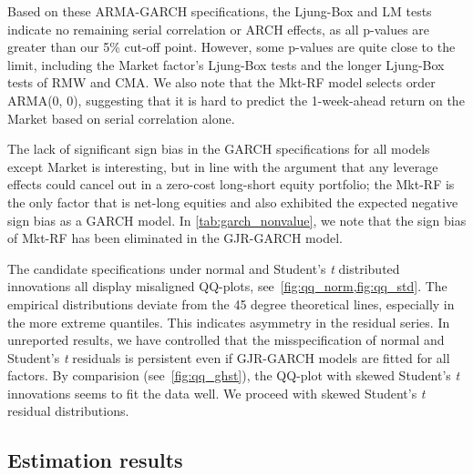 Based on these ARMA-GARCH specifications, the Ljung-Box and LM tests indicate no remaining serial correlation or ARCH effects, as all p-values are greater than our 5\% cut-off point. However, some p-values are quite close to the limit, including the Market factor's Ljung-Box tests and the longer Ljung-Box tests of RMW and CMA. We also note that the Mkt-RF model selects order ARMA(0, 0), suggesting that it is hard to predict the 1-week-ahead return on the Market based on serial correlation alone.

The lack of significant sign bias in the GARCH specifications for all models except Market is interesting, but in line with the argument that any leverage effects could cancel out in a zero-cost long-short equity portfolio; the Mkt-RF is the only factor that is net-long equities and also exhibited the expected negative sign bias as a GARCH model. In \autoref{tab:garch_nonvalue}, we note that the sign bias of Mkt-RF has been eliminated in the GJR-GARCH model. 

The candidate specifications under normal and Student's \textit{t} distributed innovations all display misaligned QQ-plots, see~\autoref{fig:qq_norm,fig:qq_std}. The empirical distributions deviate from the 45 degree theoretical lines, especially in the more extreme quantiles. This indicates asymmetry in the residual series. In unreported results, we have controlled that the misspecification of normal and Student's \textit{t} residuals is persistent even if GJR-GARCH models are fitted for all factors. By comparision (see~\autoref{fig:qq_ghst}), the QQ-plot with skewed Student's \textit{t} innovations seems to fit the data well. We proceed with skewed Student's \textit{t} residual distributions.


\subsection{Estimation results}
\label{sub:estimation_results}







